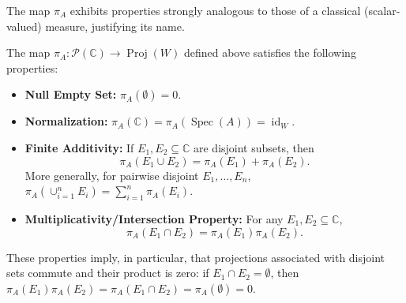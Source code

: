 The map $\pi_A$ exhibits properties strongly analogous to those of a classical (scalar-valued) measure, justifying its name.

\begin{proposition}
\label{prop:pvm_props}
The map $\pi_A: \mathcal{P}(\mathbb{C}) \to \operatorname{Proj}(W)$ defined above satisfies the following properties:
\begin{itemize}
    \item[(i)] \textbf{Null Empty Set:} $\pi_A(\emptyset) = 0$.
    \item[(ii)] \textbf{Normalization:} $\pi_A(\mathbb{C}) = \pi_A(\operatorname{Spec}(A)) = \operatorname{id}_W$.
    \item[(iii)] \textbf{Finite Additivity:} If $E_1, E_2 \subseteq \mathbb{C}$ are disjoint subsets, then
        \[ \pi_A(E_1 \cup E_2) = \pi_A(E_1) + \pi_A(E_2). \]
        More generally, for pairwise disjoint $E_1, \dots, E_n$, $\pi_A(\cup_{i=1}^n E_i) = \sum_{i=1}^n \pi_A(E_i)$.
    \item[(iv)] \textbf{Multiplicativity/Intersection Property:} For any $E_1, E_2 \subseteq \mathbb{C}$,
        \[ \pi_A(E_1 \cap E_2) = \pi_A(E_1) \pi_A(E_2). \]
\end{itemize}
These properties imply, in particular, that projections associated with disjoint sets commute and their product is zero: if $E_1 \cap E_2 = \emptyset$, then $\pi_A(E_1) \pi_A(E_2) = \pi_A(E_1 \cap E_2) = \pi_A(\emptyset) = 0$.
\end{proposition}
